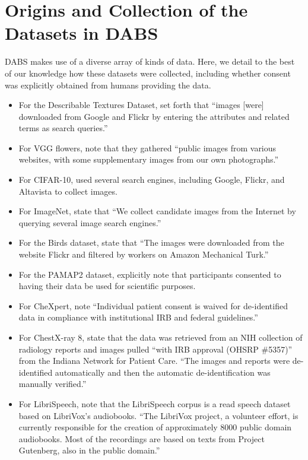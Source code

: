 \documentclass{article}
\begin{document}
\section{Origins and Collection of the Datasets in DABS}
\label{appendix:consent}
DABS makes use of a diverse array of kinds of data. Here, we detail to the best of our knowledge how these datasets were collected, including whether consent was explicitly obtained from humans providing the data.

\begin{itemize}
    \item For the Describable Textures Dataset, \citet{cimpoi14describing}  set forth that ``images [were] downloaded from Google and Flickr by entering the attributes and related terms as search queries.''
    \item For VGG flowers, \citet{Nilsback2008AutomatedFC} note that they gathered “public images from various websites, with some supplementary images from our own photographs.”
    \item For CIFAR-10, \citet{Krizhevsky2009LearningML} used several search engines, including Google, Flickr, and Altavista to collect images.
    \item For ImageNet, \citet{Russakovsky2015ImageNetLS} state that ``We collect candidate images from the Internet by querying several image search engines.''
    \item For the Birds dataset, \citet{WelinderEtal2010} state that ``The images were downloaded from the website Flickr and filtered by workers on Amazon Mechanical Turk.''
    \item For the PAMAP2 dataset, \citet{Reiss2012IntroducingAN} explicitly note that participants consented to having their data be used for scientific purposes. 
    \item For CheXpert, \citet{Garbin2021StructuredDD} note ``Individual patient consent is waived for de-identified data in compliance with institutional IRB and federal guidelines.''
    \item For ChestX-ray 8, \citet{Wang2017ChestXRay8HC} state that the data was retrieved from an NIH collection of radiology reports and images pulled ``with IRB approval (OHSRP \#5357)'' from the Indiana Network for Patient Care. ``The images and reports were de-identified automatically and then the automatic de-identification was manually verified.''
    \item For LibriSpeech, \citet{Panayotov2015LibrispeechAA} note that the LibriSpeech corpus is a read speech dataset based on LibriVox’s audiobooks. ``The LibriVox project, a volunteer effort, is currently responsible for the creation of approximately 8000 public domain audiobooks. Most of the recordings are based on texts from Project Gutenberg, also in the public domain.”

\end{itemize}
\end{document}

